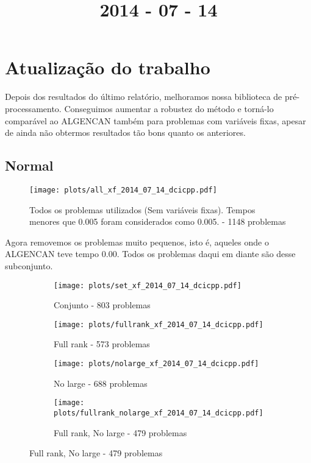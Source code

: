 \documentclass{article}
\title{2014 - 07 - 14}
\author{}
\date{}
\begin{document}
\maketitle
\section{Atualização do trabalho}

Depois dos resultados do último relatório, melhoramos nossa biblioteca de
pré-processamento. Conseguimos aumentar a robustez do método e torná-lo
comparável ao ALGENCAN também para problemas com variáveis fixas, apesar de
ainda não obtermos resultados tão bons quanto os anteriores.

\subsection{Normal}

\begin{figure}[H]
  \centering
  \texttt{[image: plots/all\_xf\_2014\_07\_14\_dcicpp.pdf]}
  \caption{Todos os problemas utilizados (Sem variáveis fixas). Tempos
    menores que 0.005 foram considerados como 0.005. - 1148 problemas}
\end{figure}
Agora removemos os problemas muito pequenos, isto é, aqueles onde o
ALGENCAN teve tempo 0.00. Todos os problemas daqui em diante são desse
subconjunto.

\begin{figure}[H]
  \centering
  \begin{subfigure}{0.48\textwidth}
    \texttt{[image: plots/set\_xf\_2014\_07\_14\_dcicpp.pdf]}
    \caption{Conjunto - 803 problemas}
  \end{subfigure}
  \begin{subfigure}{0.48\textwidth}
    \texttt{[image: plots/fullrank\_xf\_2014\_07\_14\_dcicpp.pdf]}
    \caption{Full rank - 573 problemas}
  \end{subfigure}
  \begin{subfigure}{0.48\textwidth}
    \texttt{[image: plots/nolarge\_xf\_2014\_07\_14\_dcicpp.pdf]}
    \caption{No large - 688 problemas}
  \end{subfigure}
  \begin{subfigure}{0.48\textwidth}
    \texttt{[image: plots/fullrank\_nolarge\_xf\_2014\_07\_14\_dcicpp.pdf]}
    \caption{Full rank, No large - 479 problemas}
  \end{subfigure}
\end{figure}
\end{document}
